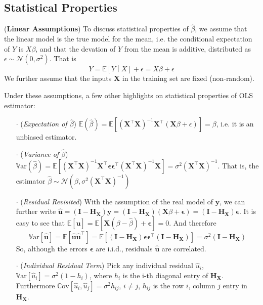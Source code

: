 \documentclass[a4paper, 11pt]{article}
\begin{document}
\subsection{Statistical Properties}

(\textbf{Linear Assumptions}) To discuss statistical properties of $\hat{\beta}$, we assume that the linear model is the true model for the mean, i.e. the conditional expectation of $Y$ is $X\beta$, and that the devation of $Y$ from the mean is additive, distributed as $\epsilon \sim \mathcal{N}(0, \sigma^2)$. That is 
$$
Y=\mathbb{E}\left[Y\middle|X\right] + \epsilon = X\beta + \epsilon
$$
We further assume that the inputs $\bm{X}$ in the training set are fixed (non-random). 

Under these assumptions, a few other highlights on statistical properties of OLS estimator:
\begin{itemize}
	\item[$\cdot$] (\emph{Expectation of $\hat{\beta}$}) $\mathbb{E}(\hat{\beta}) = \mathbb{E}\left[(\bm{X}^{\top}\bm{X})^{-1} \bm{X}^{\top}(\bm{X}\beta + \epsilon)\right] = \beta$, i.e. it is an unbiased estimator.
	\item[$\cdot$] (\emph{Variance of $\hat{\beta}$}) $\mathrm{\mathbb{V}ar}(\hat{\beta}) = \mathbb{E}\left[(\bm{X}^{\top}\bm{X})^{-1} \bm{X}^{\top} \bm{\epsilon} \bm{\epsilon}^{\top}(\bm{X}^{\top} \bm{X})^{-1} \bm{X}\right] = \sigma^2 (\bm{X}^{\top} \bm{X})^{-1}$. That is, the estimator $\hat{\beta}\sim \mathcal{N}(\beta, \sigma^2(\bm{X}^{\top} \bm{X})^{-1})$
	\item[$\cdot$] (\emph{Residual Revisited}) With the assumption of the real model of $\bm{y}$, we can further write $\hat{\bm{u}}=(\bm{I}-\bm{H}_{\bm{X}})\bm{y} = (\bm{I}-\bm{H}_{\bm{X}})(\bm{X}\beta+\bm{\epsilon}) =(\bm{I}-\bm{H}_{\bm{X}}) \bm{\epsilon} $.
	It is easy to see that $\mathbb{E}\left[\hat{\bm{u}}\right] = \mathbb{E}\left[\bm{X}(\beta-\hat{\beta})+\bm{\epsilon}\right] = 0$. And therefore
	$$
	\mathrm{\mathbb{V}ar}\left[\hat{\bm{u}}\right] = \mathbb{E}[\hat{\bm{u}}\hat{\bm{u}}^{\top}] = \mathbb{E}\left[(\bm{I}-\bm{H}_{\bm{X}}) \bm{\epsilon} \bm{\epsilon}^{\top}(\bm{I}-\bm{H}_{\bm{X}})\right] = \sigma^2 (\bm{I}-\bm{H}_{\bm{X}})
	$$
	So, although the errors $\bm{\epsilon}$ are i.i.d., residuals $\hat{\bm{u}}$ are correlated. 
	\item[$\cdot$] (\emph{Individual Residual Term}) Pick any individual residual $\hat{u}_i$, $\mathrm{\mathbb{V}ar}\left[\hat{u}_i\right] = \sigma^2(1-h_i)$, where $h_i$ is the i-th diagonal entry of $\bm{H}_{\bm{X}}$. Furthermore $\mathrm{\mathbb{C}ov}\left[\hat{u}_i, \hat{u}_j\right] = \sigma^2 h_{ij}$, $i\ne j$, $h_{ij}$ is the row $i$, column $j$ entry in $\bm{H}_{\bm{X}}$.
\end{itemize}
\end{document}
